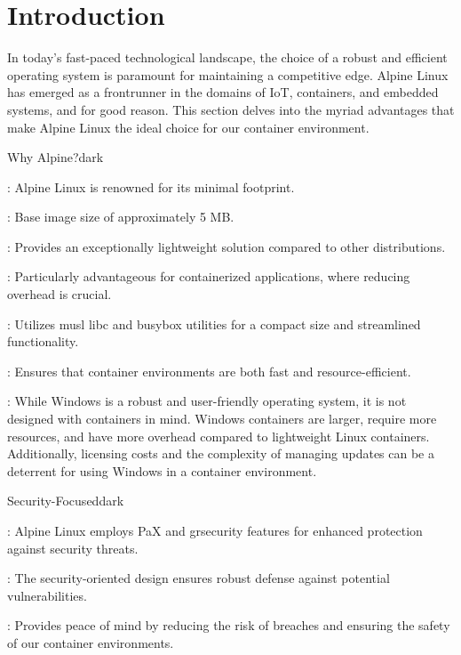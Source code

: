 \section{Introduction}
In today's fast-paced technological landscape, the choice of a robust and efficient operating system is paramount for maintaining a competitive edge.
Alpine Linux has emerged as a frontrunner in the domains of IoT, containers, and embedded systems, and for good reason.
This section delves into the myriad advantages that make Alpine Linux the ideal choice for our container environment.
\bigskip
{}
\label{Why Alpine?}
\begin{baseBoxThree}{Why Alpine?}{dark}
    \bigskip
    \begin{posnexItemize}
        \item[\sA] : Alpine Linux is renowned for its minimal footprint.
        \item[\sA] : Base image size of approximately 5 MB.
        \item[\sA] : Provides an exceptionally lightweight solution compared to other distributions.
        \item[\sA] : Particularly advantageous for containerized applications, where reducing overhead is crucial.
        \item[\sA] : Utilizes musl libc and busybox utilities for a compact size and streamlined functionality.
        \item[\sA] : Ensures that container environments are both fast and resource-efficient.
        \item[\sA] : While Windows is a robust and user-friendly operating system, it is not designed with containers in mind. Windows containers are larger, require more resources, and have more overhead compared to lightweight Linux containers. Additionally, licensing costs and the complexity of managing updates can be a deterrent for using Windows in a container environment.
    \end{posnexItemize}
    \smallskip
\end{baseBoxThree}

\label{Security-Focused}
\begin{baseBoxThree}{Security-Focused}{dark}
    \begin{posnexItemize} 
        \item[\sA] : Alpine Linux employs PaX and grsecurity features for enhanced protection against security threats.
        \item[\sA] : The security-oriented design ensures robust defense against potential vulnerabilities.
        \item[\sA] : Provides peace of mind by reducing the risk of breaches and ensuring the safety of our container environments.
    \end{posnexItemize}
\end{baseBoxThree}


